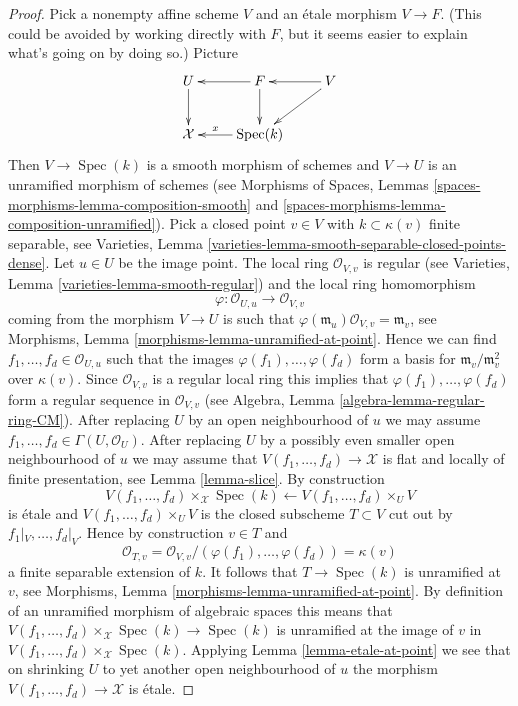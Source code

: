 \documentclass[10pt,a4paper]{amsart}
\theoremstyle{plain}
\theoremstyle{definition}
\theoremstyle{remark}
\numberwithin{equation}{subsection}
\def\Spec{\mathop{\mathrm{Spec}}}
\begin{document}
\begin{proof}
\medskip\noindent
Pick a nonempty affine scheme $V$ and an \'etale morphism $V \to F$.
(This could be avoided by working directly with $F$, but it seems easier
to explain what's going on by doing so.) Picture
$$
\xymatrix{
U \ar[d] & F  \ar[l] \ar[d] & V \ar[l] \ar[ld] \\
\mathcal{X} & \Spec(k) \ar[l]_-x
}
$$
Then $V \to \Spec(k)$ is a smooth morphism of schemes and $V \to U$ is an
unramified morphism of schemes (see
Morphisms of Spaces, Lemmas
\ref{spaces-morphisms-lemma-composition-smooth} and
\ref{spaces-morphisms-lemma-composition-unramified}).
Pick a closed point $v \in V$ with $k \subset \kappa(v)$ finite separable, see
Varieties, Lemma \ref{varieties-lemma-smooth-separable-closed-points-dense}.
Let $u \in U$ be the image point. The local ring
$\mathcal{O}_{V, v}$ is regular (see
Varieties, Lemma \ref{varieties-lemma-smooth-regular})
and the local ring homomorphism
$$
\varphi : \mathcal{O}_{U, u} \longrightarrow \mathcal{O}_{V, v}
$$
coming from the morphism $V \to U$ is such that
$\varphi(\mathfrak m_u)\mathcal{O}_{V, v} = \mathfrak m_v$, see
Morphisms, Lemma \ref{morphisms-lemma-unramified-at-point}.
Hence we can find $f_1, \ldots, f_d \in \mathcal{O}_{U, u}$
such that the images $\varphi(f_1), \ldots, \varphi(f_d)$
form a basis for $\mathfrak m_v/\mathfrak m_v^2$ over $\kappa(v)$.
Since $\mathcal{O}_{V, v}$ is a regular local ring this implies
that $\varphi(f_1), \ldots, \varphi(f_d)$ form a regular sequence
in $\mathcal{O}_{V, v}$ (see
Algebra, Lemma \ref{algebra-lemma-regular-ring-CM}).
After replacing $U$ by an open neighbourhood of $u$ we may assume
$f_1, \ldots, f_d \in \Gamma(U, \mathcal{O}_U)$. After replacing
$U$ by a possibly even smaller open neighbourhood of $u$ we may
assume that $V(f_1, \ldots, f_d) \to \mathcal{X}$ is flat and
locally of finite presentation, see
Lemma \ref{lemma-slice}.
By construction
$$
V(f_1, \ldots, f_d) \times_\mathcal{X} \Spec(k)
\longleftarrow
V(f_1, \ldots, f_d) \times_U V
$$
is \'etale and $V(f_1, \ldots, f_d) \times_U V$
is the closed subscheme $T \subset V$ cut out by $f_1|_V, \ldots, f_d|_V$.
Hence by construction $v \in T$ and
$$
\mathcal{O}_{T, v} =
\mathcal{O}_{V, v}/(\varphi(f_1), \ldots, \varphi(f_d)) = \kappa(v)
$$
a finite separable extension of $k$. It follows that $T \to \Spec(k)$
is unramified at $v$, see
Morphisms, Lemma \ref{morphisms-lemma-unramified-at-point}.
By definition of an unramified morphism of algebraic spaces this means that
$V(f_1, \ldots, f_d) \times_\mathcal{X} \Spec(k) \to \Spec(k)$
is unramified at the image of $v$ in
$V(f_1, \ldots, f_d) \times_\mathcal{X} \Spec(k)$.
Applying
Lemma \ref{lemma-etale-at-point}
we see that on shrinking $U$ to yet another open neighbourhood of $u$
the morphism $V(f_1, \ldots, f_d) \to \mathcal{X}$ is \'etale.


\end{proof}
\end{document}

